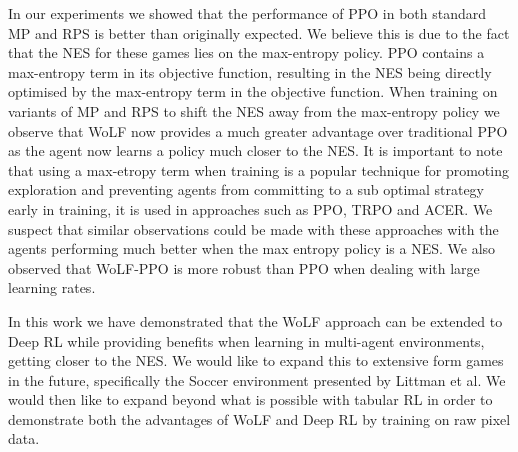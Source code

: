 \documentclass[conference]{IEEEtran}
\begin{document}
In our experiments we showed that the performance of PPO in both standard MP and RPS is better than originally expected. We believe this is due to the fact that the NES for these games lies on the max-entropy policy. PPO contains a max-entropy term in its objective function, resulting in the NES being directly optimised by the max-entropy term in the objective function. When training on variants of MP and RPS to shift the NES away from the max-entropy policy we observe that WoLF now provides a much greater advantage over traditional PPO as the agent now learns a policy much closer to the NES. It is important to note that using a max-etropy term when training is a popular technique for promoting exploration and preventing agents from committing to a sub optimal strategy early in training, it is used in approaches such as PPO\cite{schulman2017proximal}, TRPO\cite{schulman2015trust} and ACER\cite{Wang2017SampleEA}. We suspect that similar observations could be made with these approaches with the agents performing much better when the max entropy policy is a NES. We also observed that WoLF-PPO is more robust than PPO when dealing with large learning rates.

In this work we have demonstrated that the WoLF approach can be extended to Deep RL while providing benefits when learning in multi-agent environments, getting closer to the NES. We would like to expand this to extensive form games in the future, specifically the Soccer environment presented by Littman et al\cite{littman1994markov}. We would then like to expand beyond what is possible with tabular RL in order to demonstrate both the advantages of WoLF and Deep RL by training on raw pixel data.



\end{document}
